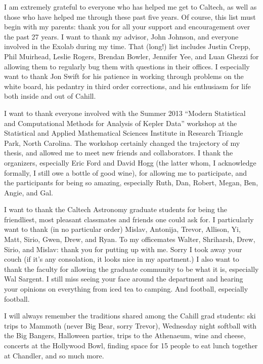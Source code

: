 \documentclass[12pt]{caltech_thesis}
\begin{document}
\begin{acknowledgements} 	 
I am extremely grateful to everyone who has helped me get to Caltech, as well as those
who have helped me through these past five years.
Of course, this list must begin with my parents: thank you for all your support and
encouragement over the past 27 years.
I want to thank my advisor, John Johnson, and everyone involved in the Exolab during 
my time. 
That (long!) list includes Justin Crepp, Phil Muirhead, Leslie Rogers,
Brendan Bowler, Jennifer Yee, and Luan Ghezzi for allowing them to regularly bug them with
questions in their offices.
I especially want to thank Jon Swift for his patience in working through problems on the
white board, his pedantry in third order corrections, and his enthusiasm for life both
inside and out of Cahill.

I want to thank everyone involved with the Summer 2013 ``Modern Statistical and
Computational Methods for Analysis of Kepler Data'' workshop at the Statistical and
Applied Mathematical Sciences Institute in Research Triangle Park, North Carolina.
The workshop certainly changed the trajectory of my thesis, and allowed me to meet 
new friends and collaborators. 
I thank the organizers, especially Eric Ford and David Hogg (the latter whom, I
acknowledge formally,
I still owe a bottle of good wine), for allowing me to participate, and the participants
for being so amazing, especially Ruth, Dan, Robert, Megan, Ben, Angie, and Gal.

I want to thank the Caltech Astronomy graduate students for being the friendliest, 
most pleasant classmates and friends one could ask for. 
I particularly want to thank (in no particular order) Mislav, Antonija, Trevor, Allison, Yi, Matt, Sirio,
Gwen, Drew, and Ryan. 
To my officemates Walter, Shriharsh, Drew, Sirio, and Mislav: thank you for putting up
with me. Sorry I took away your couch (if it's any consolation, it looks nice in my 
apartment.)
I also want to thank the faculty for allowing the graduate community to be what it is, 
especially Wal Sargent. I still miss seeing your face around the department and hearing
your opinions on everything from iced tea to camping. And football, especially football.

I will always remember the traditions shared among the Cahill grad students: 
ski trips to Mammoth (never Big Bear, sorry Trevor), Wednesday night softball with the Big Bangers,
Halloween parties, trips to the Athenaeum, wine and cheese, concerts at the Hollywood
Bowl, finding space for 15 people to eat lunch together at Chandler, and so much more.


\end{acknowledgements}
\end{document}
